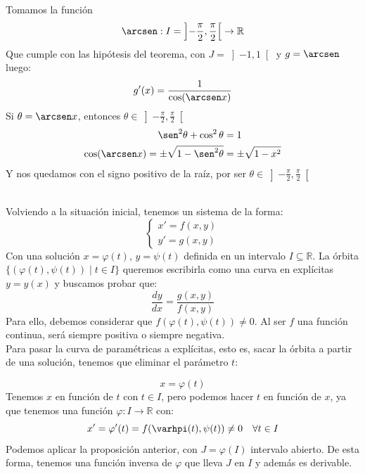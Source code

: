 
\begin{ejemplo}
    Tomamos la función
    \begin{equation*}
        \arcsen : I=\left]-\frac{\pi}{2}, \frac{\pi}{2}\right[ \rightarrow \mathbb{R}
    \end{equation*}
    Que cumple con las hipótesis del teorema, con $J = \left]-1,1\right[$ y $g = \arcsen$ luego:
    \begin{equation*}
        g'(x) = \dfrac{1}{\cos(\arcsen x)}
    \end{equation*}
    Si $\theta = \arcsen x$, entonces $\theta \in \left]-\frac{\pi}{2}, \frac{\pi}{2}\right[$
    \begin{align*}
        \sen^2 \theta + \cos^2 \theta &= 1 \\
        \cos(\arcsen x) = \pm \sqrt{1-\sen^2 \theta} &= \pm \sqrt{1-x^2}
    \end{align*}
    Y nos quedamos con el signo positivo de la raíz, por ser $\theta \in \left]-\frac{\pi}{2},\frac{\pi}{2}\right[$
\end{ejemplo}~\\

\noindent
Volviendo a la situación inicial, tenemos un sistema de la forma:
\begin{equation*}
    \left\{\begin{array}{c}
            x' = f(x,y) \\
            y' = g(x,y)
    \end{array}\right.
\end{equation*}
Con una solución $x=\varphi(t)$, $y=\psi(t)$ definida en un intervalo $I\subseteq \mathbb{R}$.
La órbita $\{(\varphi(t),\psi(t)) \mid t \in I\}$ queremos escribirla como una curva en explícitas $y=y(x)$ y buscamos probar que:
\begin{equation*}
    \dfrac{dy}{dx} = \dfrac{g(x,y)}{f(x,y)}
\end{equation*}
Para ello, debemos considerar que $f(\varphi(t),\psi(t))\neq 0$. Al ser $f$ una función continua, será siempre positiva o siempre negativa.\\

Para pasar la curva de paramétricas a explícitas, esto es, sacar la órbita a partir de una solución, tenemos que eliminar el parámetro $t$:

\begin{equation*}
    x=\varphi(t)
\end{equation*}
Tenemos $x$ en función de $t$ con $t\in I$, pero podemos hacer $t$ en función de $x$, ya que tenemos una función $\varphi:I\rightarrow\mathbb{R}$ con:
\begin{equation*}
    x' = \varphi'(t) = f(\varhpi(t),\psi(t)) \neq 0 \quad \forall t\in I
\end{equation*}
Podemos aplicar la proposición anterior, con $J=\varphi(I)$ intervalo abierto. De esta forma, tenemos una función inversa de $\varphi$ que lleva $J$ en $I$ y además es derivable.


